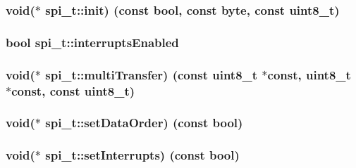 \subsubsection[{init}]{\setlength{\rightskip}{0pt plus 5cm}void($\ast$ spi\+\_\+t\+::init) (const bool, const {\bf byte}, const uint8\+\_\+t)}\label{structspi__t_ad2af834982883f711c192bf661156942}
\hypertarget{structspi__t_aa4467a109fa5d9e59a4b36f4a9728987}{}
\subsubsection[{interrupts\+Enabled}]{\setlength{\rightskip}{0pt plus 5cm}bool spi\+\_\+t\+::interrupts\+Enabled}\label{structspi__t_aa4467a109fa5d9e59a4b36f4a9728987}
\hypertarget{structspi__t_af877ab42dc1f23e4b362046d67cc2f06}{}
\subsubsection[{multi\+Transfer}]{\setlength{\rightskip}{0pt plus 5cm}void($\ast$ spi\+\_\+t\+::multi\+Transfer) (const uint8\+\_\+t $\ast$const, uint8\+\_\+t $\ast$const, const uint8\+\_\+t)}\label{structspi__t_af877ab42dc1f23e4b362046d67cc2f06}
\hypertarget{structspi__t_a9666930bc1583041cf42e4ec184dd180}{}
\subsubsection[{set\+Data\+Order}]{\setlength{\rightskip}{0pt plus 5cm}void($\ast$ spi\+\_\+t\+::set\+Data\+Order) (const bool)}\label{structspi__t_a9666930bc1583041cf42e4ec184dd180}
\hypertarget{structspi__t_a9011a7370d987842947f716e10f8f652}{}
\subsubsection[{set\+Interrupts}]{\setlength{\rightskip}{0pt plus 5cm}void($\ast$ spi\+\_\+t\+::set\+Interrupts) (const bool)}\label{structspi__t_a9011a7370d987842947f716e10f8f652}
\hypertarget{structspi__t_a55f7c22f62fbe49b04920f1902102f0c}{}

